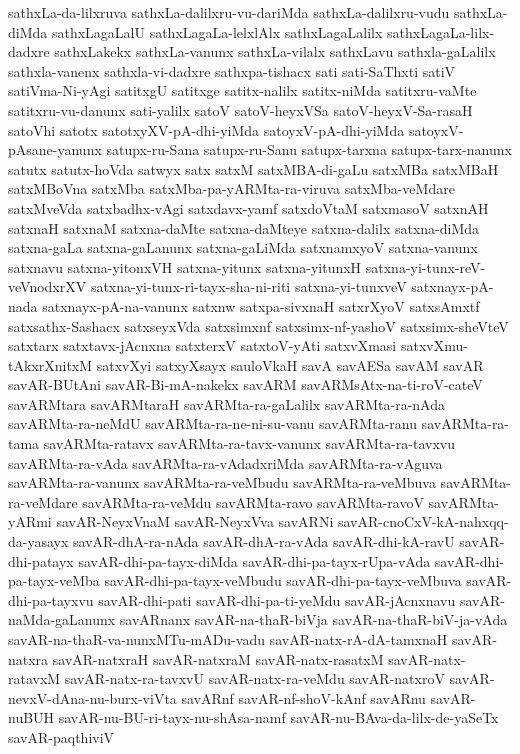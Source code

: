 {sathxLa-da-lilxruva
sathxLa-dalilxru-vu-dariMda
sathxLa-dalilxru-vudu
sathxLa-diMda
sathxLagaLalU
sathxLagaLa-lelxlAlx
sathxLagaLalilx
sathxLagaLa-lilx-dadxre
sathxLakekx
sathxLa-vanunx
sathxLa-vilalx
sathxLavu
sathxla-gaLalilx
sathxla-vanenx
sathxla-vi-dadxre
sathxpa-tishacx
sati
sati-SaThxti
satiV
satiVma-Ni-yAgi
satitxgU
satitxge
satitx-nalilx
satitx-niMda
satitxru-vaMte
satitxru-vu-danunx
sati-yalilx
satoV
satoV-heyxVSa
satoV-heyxV-Sa-rasaH
satoVhi
satotx
satotxyXV-pA-dhi-yiMda
satoyxV-pA-dhi-yiMda
satoyxV-pAsane-yanunx
satupx-ru-Sana
satupx-ru-Sanu
satupx-tarxna
satupx-tarx-nanunx
satutx
satutx-hoVda
satwyx
satx
satxM
satxMBA-di-gaLu
satxMBa
satxMBaH
satxMBoVna
satxMba
satxMba-pa-yARMta-ra-viruva
satxMba-veMdare
satxMveVda
satxbadhx-vAgi
satxdavx-yamf
satxdoVtaM
satxmasoV
satxnAH
satxnaH
satxnaM
satxna-daMte
satxna-daMteye
satxna-dalilx
satxna-diMda
satxna-gaLa
satxna-gaLanunx
satxna-gaLiMda
satxnamxyoV
satxna-vanunx
satxnavu
satxna-yitonxVH
satxna-yitunx
satxna-yitunxH
satxna-yi-tunx-reV-veVnodxrXV
satxna-yi-tunx-ri-tayx-sha-ni-riti
satxna-yi-tunxveV
satxnayx-pA-nada
satxnayx-pA-na-vanunx
satxnw
satxpa-sivxnaH
satxrXyoV
satxsAmxtf
satxsathx-Sashacx
satxseyxVda
satxsimxnf
satxsimx-nf-yashoV
satxsimx-sheVteV
satxtarx
satxtavx-jAcnxna
satxterxV
satxtoV-yAti
satxvXmasi
satxvXmu-tAkxrXnitxM
satxvXyi
satxyXsayx
sauloVkaH
savA
savAESa
savAM
savAR
savAR-BUtAni
savAR-Bi-mA-nakekx
savARM
savARMsAtx-na-ti-roV-cateV
savARMtara
savARMtaraH
savARMta-ra-gaLalilx
savARMta-ra-nAda
savARMta-ra-neMdU
savARMta-ra-ne-ni-su-vanu
savARMta-ranu
savARMta-ra-tama
savARMta-ratavx
savARMta-ra-tavx-vanunx
savARMta-ra-tavxvu
savARMta-ra-vAda
savARMta-ra-vAdadxriMda
savARMta-ra-vAguva
savARMta-ra-vanunx
savARMta-ra-veMbudu
savARMta-ra-veMbuva
savARMta-ra-veMdare
savARMta-ra-veMdu
savARMta-ravo
savARMta-ravoV
savARMta-yARmi
savAR-NeyxVnaM
savAR-NeyxVva
savARNi
savAR-cnoCxV-kA-nahxqq-da-yasayx
savAR-dhA-ra-nAda
savAR-dhA-ra-vAda
savAR-dhi-kA-ravU
savAR-dhi-patayx
savAR-dhi-pa-tayx-diMda
savAR-dhi-pa-tayx-rUpa-vAda
savAR-dhi-pa-tayx-veMba
savAR-dhi-pa-tayx-veMbudu
savAR-dhi-pa-tayx-veMbuva
savAR-dhi-pa-tayxvu
savAR-dhi-pati
savAR-dhi-pa-ti-yeMdu
savAR-jAcnxnavu
savAR-naMda-gaLanunx
savARnanx
savAR-na-thaR-biVja
savAR-na-thaR-biV-ja-vAda
savAR-na-thaR-va-nunxMTu-mADu-vadu
savAR-natx-rA-dA-tamxnaH
savAR-natxra
savAR-natxraH
savAR-natxraM
savAR-natx-rasatxM
savAR-natx-ratavxM
savAR-natx-ra-tavxvU
savAR-natx-ra-veMdu
savAR-natxroV
savAR-nevxV-dAna-nu-burx-viVta
savARnf
savAR-nf-shoV-kAnf
savARnu
savAR-nuBUH
savAR-nu-BU-ri-tayx-nu-shAsa-namf
savAR-nu-BAva-da-lilx-de-yaSeTx
savAR-paqthiviV
}
